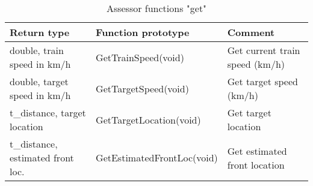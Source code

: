 \documentclass{template/openetcs_article}
\begin{document}
\begin{longtable}{|l|l|l|}
	\caption{Assessor functions "get"} \\
	\hline
		\begin{minipage}[t]{0.35\linewidth} \textbf{Return type} \end{minipage}
	&	\begin{minipage}[t]{0.35\linewidth} \textbf{Function prototype} \end{minipage} 
	&	\begin{minipage}[t]{0.35\linewidth} \textbf{Comment} \end{minipage} \\
	\hline
		\begin{minipage}[t]{0.35\linewidth} double, train speed in km/h	\end{minipage} 
	&	\begin{minipage}[t]{0.35\linewidth} GetTrainSpeed(void) \end{minipage} 
	&	\begin{minipage}[t]{0.35\linewidth} Get current train speed (km/h) \end{minipage} \\
	\hline
		\begin{minipage}[t]{0.35\linewidth} double, target speed in km/h \end{minipage} 
	&	\begin{minipage}[t]{0.35\linewidth} GetTargetSpeed(void) \end{minipage} 
	&	\begin{minipage}[t]{0.35\linewidth} Get target speed (km/h) \end{minipage} \\
	\hline
		\begin{minipage}[t]{0.35\linewidth} t\_distance, target location \end{minipage} 
	&	\begin{minipage}[t]{0.35\linewidth} GetTargetLocation(void) \end{minipage} 
	&	\begin{minipage}[t]{0.35\linewidth} Get target location \end{minipage} \\
	\hline
		\begin{minipage}[t]{0.35\linewidth} t\_distance, estimated front loc. \end{minipage}
	&	\begin{minipage}[t]{0.35\linewidth} GetEstimatedFrontLoc(void) \end{minipage} 
	&	\begin{minipage}[t]{0.35\linewidth} Get estimated front location \end{minipage} \\

\end{longtable}
\end{document}

